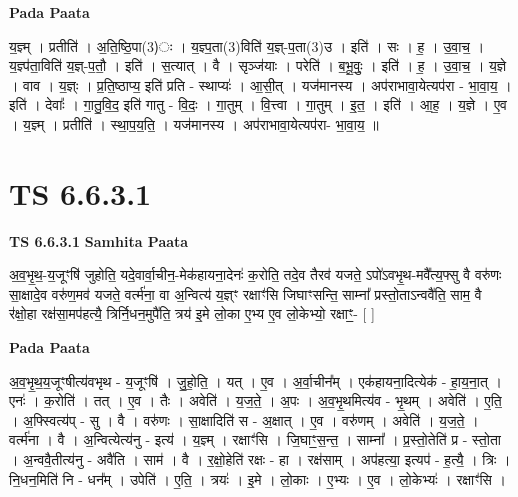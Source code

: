 \documentclass[17pt]{extarticle}
\begin{document}
\textbf{Pada Paata} \newline

य॒ज्ञ्म् । प्रतीति॑ । अ॒ति॒ष्ठि॒पा(3)ः । य॒ज्ञ्प॒ता(3)विति॑ य॒ज्ञ्-प॒ता(3)उ । इति॑ । सः । ह॒ । उ॒वा॒च॒ । य॒ज्ञ्प॑ता॒विति॑ य॒ज्ञ्-प॒तौ॒ । इति॑ । स॒त्यात् । वै । सृञ्ज॑याः । परेति॑ । ब॒भू॒वुः॒ । इति॑ । ह॒ । उ॒वा॒च॒ । य॒ज्ञे । वाव । य॒ज्ञ्ः । प्र॒ति॒ष्ठाप्य॒ इति॑ प्रति - स्थाप्यः॑ । आ॒सी॒त् । यज॑मानस्य । अप॑राभावा॒येत्यप॑रा - भा॒वा॒य॒ । इति॑ । देवाः᳚ । गा॒तु॒वि॒द॒ इति॑ गातु - वि॒दः॒ । गा॒तुम् । वि॒त्त्वा । गा॒तुम् । इ॒त॒ । इति॑ । आ॒ह॒ । य॒ज्ञे । ए॒व । य॒ज्ञ्म् । प्रतीति॑ । स्था॒प॒य॒ति॒ । यज॑मानस्य । अप॑राभावा॒येत्यप॑रा- भा॒वा॒य॒ ॥  \newline




\section*{ TS 6.6.3.1 }

\textbf{TS 6.6.3.1 } \newline
\textbf{Samhita Paata} \newline

अ॒व॒भृ॒थ॒-य॒जूꣳषि॑ जुहोति॒ यदे॒वार्वा॒चीन॒-मेक॑हायना॒देनः॑ क॒रोति॒ तदे॒व तैरव॑ यजते॒ ऽपो॑ऽवभृ॒थ-मवै᳚त्य॒फ्सु वै वरु॑णः सा॒क्षादे॒व वरु॑ण॒मव॑ यजते॒ वर्त्म॑ना॒ वा अ॒न्वित्य॑ य॒ज्ञ्ꣳ रक्षाꣳ॑सि जिघाꣳसन्ति॒ साम्ना᳚ प्रस्तो॒ताऽन्ववै॑ति॒ साम॒ वै र॑क्षो॒हा रक्ष॑सा॒मप॑हत्यै॒ त्रिर्नि॒धन॒मुपै॑ति॒ त्रय॑ इ॒मे लो॒का ए॒भ्य ए॒व लो॒केभ्यो॒ रक्षाꣳ॒॒- [  ] \newline

\textbf{Pada Paata} \newline

अ॒व॒भृ॒थ॒य॒जूꣳषीत्य॑वभृथ - य॒जूꣳषि॑ । जु॒हो॒ति॒ । यत् । ए॒व । अ॒र्वा॒चीन᳚म् । एक॑हायना॒दित्येक॑ - हा॒य॒ना॒त् । एनः॑ । क॒रोति॑ । तत् । ए॒व । तैः । अवेति॑ । य॒ज॒ते॒ । अ॒पः । अ॒व॒भृ॒थमित्य॑व - भृ॒थम् । अवेति॑ । ए॒ति॒ । अ॒फ्स्वित्य॑प् - सु । वै । वरु॑णः । सा॒क्षादिति॑ स - अ॒क्षात् । ए॒व । वरु॑णम् । अवेति॑ । य॒ज॒ते॒ । वर्त्म॑ना । वै । अ॒न्वित्येत्य॑नु - इत्य॑ । य॒ज्ञ्म् । रक्षाꣳ॑सि । जि॒घाꣳ॒॒स॒न्त॒ । साम्ना᳚ । प्र॒स्तो॒तेति॑ प्र - स्तो॒ता । अ॒न्ववै॒तीत्य॑नु - अवै॑ति । साम॑ । वै । र॒क्षो॒हेति॑ रक्षः - हा । रक्ष॑साम् । अप॑हत्या॒ इत्यप॑ - ह॒त्यै॒ । त्रिः । नि॒धन॒मिति॑ नि - धन᳚म् । उपेति॑ । ए॒ति॒ । त्रयः॑ । इ॒मे । लो॒काः । ए॒भ्यः । ए॒व । लो॒केभ्यः॑ । रक्षाꣳ॑सि ।  \newline
\end{document}
